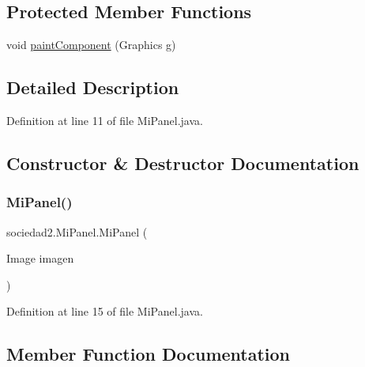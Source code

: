 \subsection*{Protected Member Functions}
\begin{DoxyCompactItemize}
\item 
void \mbox{\hyperlink{classsociedad2_1_1_mi_panel_a6dc4cf9761290c785f3d046799043ad4}{paint\+Component}} (Graphics g)
\end{DoxyCompactItemize}


\subsection{Detailed Description}


Definition at line 11 of file Mi\+Panel.\+java.



\subsection{Constructor \& Destructor Documentation}
\mbox{\label{classsociedad2_1_1_mi_panel_a728fc4503e18ffec92d5391ef75f7f40}} 
\subsubsection{\texorpdfstring{Mi\+Panel()}{MiPanel()}}
{\footnotesize\ttfamily sociedad2.\+Mi\+Panel.\+Mi\+Panel (\begin{DoxyParamCaption}\item[{Image}]{imagen }\end{DoxyParamCaption})}



Definition at line 15 of file Mi\+Panel.\+java.



\subsection{Member Function Documentation}
\mbox{\label{classsociedad2_1_1_mi_panel_a6dc4cf9761290c785f3d046799043ad4}} 
